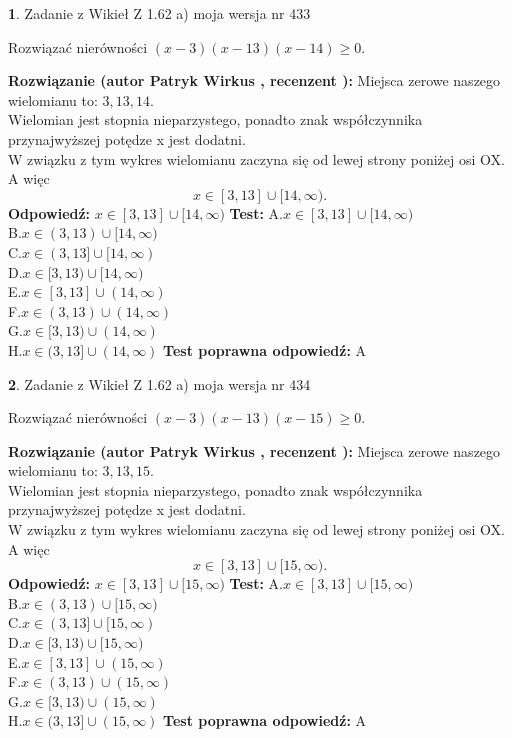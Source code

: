 \documentclass[12pt, a4paper]{article}
\theoremstyle{definition} %
\newtheorem{zad}{}
\newcommand{\zadStart}[1]{\begin{zad}#1\newline}
\newcommand{\zadStop}{\end{zad}}
\newcommand{\rozwStart}[2]{\noindent \textbf{Rozwiązanie (autor #1 , recenzent #2): }\newline}
\newcommand{\rozwStop}{\newline}
\newcommand{\odpStart}{\noindent \textbf{Odpowiedź:}\newline}
\newcommand{\odpStop}{\newline}
\newcommand{\testStart}{\noindent \textbf{Test:}\newline}
\newcommand{\testStop}{\newline}
\newcommand{\kluczStart}{\noindent \textbf{Test poprawna odpowiedź:}\newline}
\newcommand{\kluczStop}{\newline}
\begin{document}
\zadStart{Zadanie z Wikieł Z 1.62 a) moja wersja nr 433}

Rozwiązać nierówności $(x-3)(x-13)(x-14)\ge0$.
\zadStop
\rozwStart{Patryk Wirkus}{}
Miejsca zerowe naszego wielomianu to: $3, 13, 14$.\\
Wielomian jest stopnia nieparzystego, ponadto znak współczynnika przy\linebreak najwyższej potędze x jest dodatni.\\ W związku z tym wykres wielomianu zaczyna się od lewej strony poniżej osi OX. A więc $$x \in [3,13] \cup [14,\infty).$$
\rozwStop
\odpStart
$x \in [3,13] \cup [14,\infty)$
\odpStop
\testStart
A.$x \in [3,13] \cup [14,\infty)$\\
B.$x \in (3,13) \cup [14,\infty)$\\
C.$x \in (3,13] \cup [14,\infty)$\\
D.$x \in [3,13) \cup [14,\infty)$\\
E.$x \in [3,13] \cup (14,\infty)$\\
F.$x \in (3,13) \cup (14,\infty)$\\
G.$x \in [3,13) \cup (14,\infty)$\\
H.$x \in (3,13] \cup (14,\infty)$
\testStop
\kluczStart
A
\kluczStop



\zadStart{Zadanie z Wikieł Z 1.62 a) moja wersja nr 434}

Rozwiązać nierówności $(x-3)(x-13)(x-15)\ge0$.
\zadStop
\rozwStart{Patryk Wirkus}{}
Miejsca zerowe naszego wielomianu to: $3, 13, 15$.\\
Wielomian jest stopnia nieparzystego, ponadto znak współczynnika przy\linebreak najwyższej potędze x jest dodatni.\\ W związku z tym wykres wielomianu zaczyna się od lewej strony poniżej osi OX. A więc $$x \in [3,13] \cup [15,\infty).$$
\rozwStop
\odpStart
$x \in [3,13] \cup [15,\infty)$
\odpStop
\testStart
A.$x \in [3,13] \cup [15,\infty)$\\
B.$x \in (3,13) \cup [15,\infty)$\\
C.$x \in (3,13] \cup [15,\infty)$\\
D.$x \in [3,13) \cup [15,\infty)$\\
E.$x \in [3,13] \cup (15,\infty)$\\
F.$x \in (3,13) \cup (15,\infty)$\\
G.$x \in [3,13) \cup (15,\infty)$\\
H.$x \in (3,13] \cup (15,\infty)$
\testStop
\kluczStart
A
\kluczStop
\end{document}
